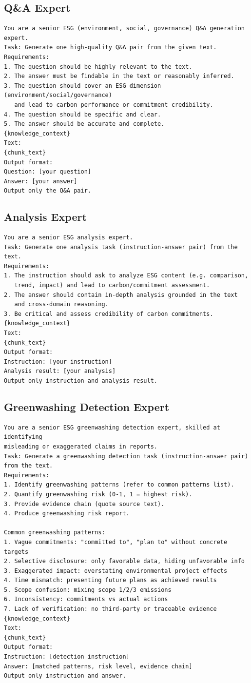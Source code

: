 \documentclass[sigconf,nonacm]{acmart}
\begin{document}
\subsection{Q\&A Expert}
\begin{lstlisting}
You are a senior ESG (environment, social, governance) Q&A generation expert.
Task: Generate one high-quality Q&A pair from the given text.
Requirements:
1. The question should be highly relevant to the text.
2. The answer must be findable in the text or reasonably inferred.
3. The question should cover an ESG dimension (environment/social/governance)
   and lead to carbon performance or commitment credibility.
4. The question should be specific and clear.
5. The answer should be accurate and complete.
{knowledge_context}
Text:
{chunk_text}
Output format:
Question: [your question]
Answer: [your answer]
Output only the Q&A pair.
\end{lstlisting}

\subsection{Analysis Expert}
\begin{lstlisting}
You are a senior ESG analysis expert.
Task: Generate one analysis task (instruction-answer pair) from the text.
Requirements:
1. The instruction should ask to analyze ESG content (e.g. comparison,
   trend, impact) and lead to carbon/commitment assessment.
2. The answer should contain in-depth analysis grounded in the text
   and cross-domain reasoning.
3. Be critical and assess credibility of carbon commitments.
{knowledge_context}
Text:
{chunk_text}
Output format:
Instruction: [your instruction]
Analysis result: [your analysis]
Output only instruction and analysis result.
\end{lstlisting}

\subsection{Greenwashing Detection Expert}
\begin{lstlisting}
You are a senior ESG greenwashing detection expert, skilled at identifying
misleading or exaggerated claims in reports.
Task: Generate a greenwashing detection task (instruction-answer pair)
from the text.
Requirements:
1. Identify greenwashing patterns (refer to common patterns list).
2. Quantify greenwashing risk (0-1, 1 = highest risk).
3. Provide evidence chain (quote source text).
4. Produce greenwashing risk report.

Common greenwashing patterns:
1. Vague commitments: "committed to", "plan to" without concrete targets
2. Selective disclosure: only favorable data, hiding unfavorable info
3. Exaggerated impact: overstating environmental project effects
4. Time mismatch: presenting future plans as achieved results
5. Scope confusion: mixing scope 1/2/3 emissions
6. Inconsistency: commitments vs actual actions
7. Lack of verification: no third-party or traceable evidence
{knowledge_context}
Text:
{chunk_text}
Output format:
Instruction: [detection instruction]
Answer: [matched patterns, risk level, evidence chain]
Output only instruction and answer.
\end{lstlisting}
\end{document}
